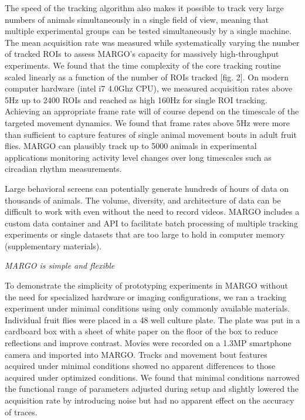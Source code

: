 \documentclass[10pt]{article}
\begin{document}
\begin{multicols}{2}
The speed of the tracking algorithm also makes it possible to track very large numbers of animals simultaneously in a single field of view, meaning that multiple experimental groups can be tested simultaneously by a single machine. The mean acquisition rate was measured while systematically varying the number of tracked ROIs to assess MARGO’s capacity for massively high-throughput experiments. We found that the time complexity of the core tracking routine scaled linearly as a function of the number of ROIs tracked [fig. 2]. On modern computer hardware (intel i7 4.0Ghz CPU), we measured acquisition rates above 5Hz up to 2400 ROIs and reached as high 160Hz for single ROI tracking. Achieving an appropriate frame rate will of course depend on the timescale of the targeted movement dynamics. We found that frame rates above 5Hz were more than sufficient to capture features of single animal movement bouts in adult fruit flies. MARGO can plausibly track up to 5000 animals in experimental applications monitoring activity level changes over long timescales such as circadian rhythm measurements. 

Large behavioral screens can potentially generate hundreds of hours of data on thousands of animals. The volume, diversity, and architecture of data can be difficult to work with even without the need to record videos. MARGO includes a custom data container and API to facilitate batch processing of multiple tracking experiments or single datasets that are too large to hold in computer memory (supplementary materials). 

\textit{MARGO is simple and flexible}

To demonstrate the simplicity of prototyping experiments in MARGO without the need for specialized hardware or imaging configurations, we ran a tracking experiment under minimal conditions using only commonly available materials.  Individual fruit flies were placed in a 48 well culture plate. The plate was put in a cardboard box with a sheet of white paper on the floor of the box to reduce reflections and improve contrast. Movies were recorded on a 1.3MP smartphone camera and imported into MARGO. Tracks and movement bout features acquired under minimal conditions showed no apparent differences to those acquired under optimized conditions. We found that minimal conditions narrowed the functional range of parameters adjusted during setup and slightly lowered the acquisition rate by introducing noise but had no apparent effect on the accuracy of traces.


\end{multicols}
\end{document}
